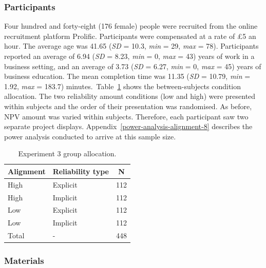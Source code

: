 \documentclass[a4paper, nobind, dvipsnames]{templates/ociamthesis}
\theoremstyle{definition}
\theoremstyle{definition}
\theoremstyle{definition}
\theoremstyle{definition}
\theoremstyle{remark}
\begin{document}
\subsubsection{Participants}

Four hundred and forty-eight (176 female) people were recruited from the online recruitment platform Prolific. Participants were compensated at a rate of £5 an hour. The average age was 41.65 (\emph{SD} = 10.3, \emph{min} = 29, \emph{max} = 78). Participants reported an average of 6.94 (\emph{SD} = 8.23, \emph{min} = 0, \emph{max} = 43) years of work in a business setting, and an average of 3.73 (\emph{SD} = 6.27, \emph{min} = 0, \emph{max} = 45) years of business education. The mean completion time was 11.35 (\emph{SD} = 10.79, \emph{min} = 1.92, \emph{max} = 183.7) minutes.~Table~\ref{tab:condition-allocation-alignment-8}
shows the between-subjects condition allocation. The two reliability amount
conditions (low and high) were presented within subjects and the order of their
presentation was randomised. As before, NPV amount was varied within subjects.
Therefore, each participant saw two separate project displays.
Appendix~\ref{power-analysis-alignment-8} describes the power analysis
conducted to arrive at this sample size.

\begin{table}[tbp]

\begin{center}
\begin{threeparttable}

\caption{\label{tab:condition-allocation-alignment-8}Experiment 3 group allocation.}

\begin{tabular}{lll}
\toprule
Alignment & \multicolumn{1}{c}{Reliability type} & \multicolumn{1}{c}{N}\\
\midrule
High & Explicit & 112\\
High & Implicit & 112\\
Low & Explicit & 112\\
Low & Implicit & 112\\
Total & - & 448\\
\bottomrule
\end{tabular}

\end{threeparttable}
\end{center}

\end{table}

\subsubsection{Materials}
\end{document}
